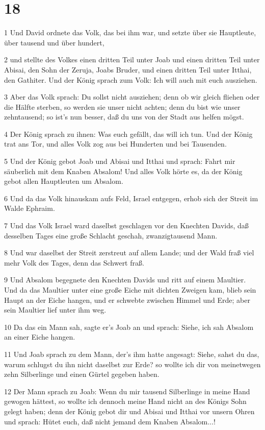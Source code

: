 \chapter{18}

\par 1 Und David ordnete das Volk, das bei ihm war, und setzte über sie Hauptleute, über tausend und über hundert,
\par 2 und stellte des Volkes einen dritten Teil unter Joab und einen dritten Teil unter Abisai, den Sohn der Zeruja, Joabs Bruder, und einen dritten Teil unter Itthai, den Gathiter. Und der König sprach zum Volk: Ich will auch mit euch ausziehen.
\par 3 Aber das Volk sprach: Du sollst nicht ausziehen; denn ob wir gleich fliehen oder die Hälfte sterben, so werden sie unser nicht achten; denn du bist wie unser zehntausend; so ist's nun besser, daß du uns von der Stadt aus helfen mögst.
\par 4 Der König sprach zu ihnen: Was euch gefällt, das will ich tun. Und der König trat ans Tor, und alles Volk zog aus bei Hunderten und bei Tausenden.
\par 5 Und der König gebot Joab und Abisai und Itthai und sprach: Fahrt mir säuberlich mit dem Knaben Absalom! Und alles Volk hörte es, da der König gebot allen Hauptleuten um Absalom.
\par 6 Und da das Volk hinauskam aufs Feld, Israel entgegen, erhob sich der Streit im Walde Ephraim.
\par 7 Und das Volk Israel ward daselbst geschlagen vor den Knechten Davids, daß desselben Tages eine große Schlacht geschah, zwanzigtausend Mann.
\par 8 Und war daselbst der Streit zerstreut auf allem Lande; und der Wald fraß viel mehr Volk des Tages, denn das Schwert fraß.
\par 9 Und Absalom begegnete den Knechten Davids und ritt auf einem Maultier. Und da das Maultier unter eine große Eiche mit dichten Zweigen kam, blieb sein Haupt an der Eiche hangen, und er schwebte zwischen Himmel und Erde; aber sein Maultier lief unter ihm weg.
\par 10 Da das ein Mann sah, sagte er's Joab an und sprach: Siehe, ich sah Absalom an einer Eiche hangen.
\par 11 Und Joab sprach zu dem Mann, der's ihm hatte angesagt: Siehe, sahst du das, warum schlugst du ihn nicht daselbst zur Erde? so wollte ich dir von meinetwegen zehn Silberlinge und einen Gürtel gegeben haben.
\par 12 Der Mann sprach zu Joab: Wenn du mir tausend Silberlinge in meine Hand gewogen hättest, so wollte ich dennoch meine Hand nicht an des Königs Sohn gelegt haben; denn der König gebot dir und Abisai und Itthai vor unsern Ohren und sprach: Hütet euch, daß nicht jemand dem Knaben Absalom...!
